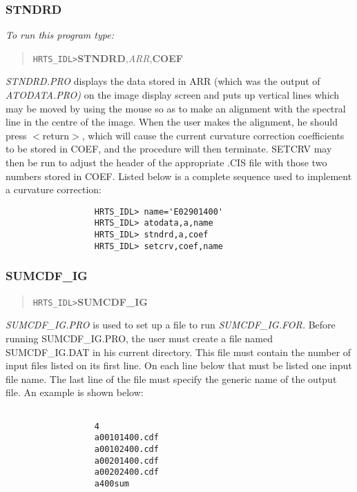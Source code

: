 \subsubsection{STNDRD}

{\em To run this program type:}

\begin{quote}   
     {\tt HRTS\_IDL>}{\bf STNDRD},{\it ARR},{\bf COEF}                
\end{quote}   
{\em STNDRD.PRO} displays the data stored in ARR (which was the output of
{\em ATODATA.PRO)} on the image display screen and puts up vertical lines which 
may be
   moved by using the mouse so as to make an alignment with the spectral
   line in the centre of the image.  When the user makes the alignment, he
   should press $<$return$>$, which will cause the current curvature
   correction coefficients to be stored in COEF, and the procedure will
   then terminate.  SETCRV may then be run to adjust the header of the
   appropriate .CIS file with those two numbers stored in COEF.
      Listed below is a complete sequence used to implement a curvature
   correction:
\begin{verbatim}
                  HRTS_IDL> name='E02901400'
                  HRTS_IDL> atodata,a,name
                  HRTS_IDL> stndrd,a,coef
                  HRTS_IDL> setcrv,coef,name
\end{verbatim}   

\subsubsection{SUMCDF\_IG}

\begin{quote}   
     {\tt HRTS\_IDL>}{\bf SUMCDF\_IG}            
\end{quote}   
{\em SUMCDF\_IG.PRO} is used to set up a file to run {\em SUMCDF\_IG.FOR.}
   Before running SUMCDF\_IG.PRO, the user must create a file named
   SUMCDF\_IG.DAT in his current directory.  This file must contain the
   number of input files listed on its first line.  On each line below
   that must be listed one input file name.  The last line of the file
   must specify the generic name of the output file.  An example is shown
   below:
\begin{center}
\begin{verbatim}   

                  4                                    
                  a00101400.cdf                        
                  a00102400.cdf                        
                  a00201400.cdf                        
                  a00202400.cdf                        
                  a400sum                              
               
\end{verbatim}   
\end{center}

